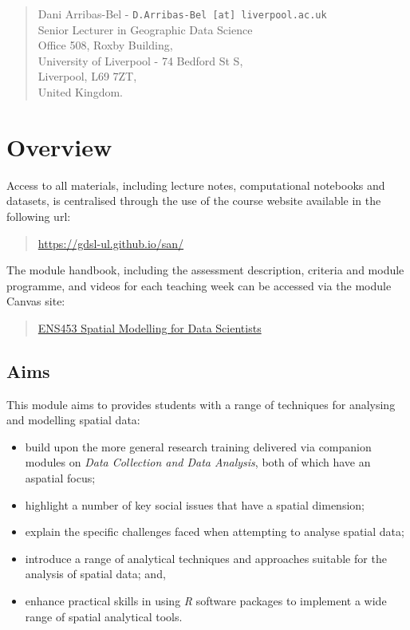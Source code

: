 \documentclass[
]{book}
\providecommand{\tightlist}{%
  \setlength{\itemsep}{0pt}\setlength{\parskip}{0pt}}
\begin{document}
\begin{quote}
Dani Arribas-Bel - \texttt{D.Arribas-Bel\ {[}at{]}\ liverpool.ac.uk}\\
Senior Lecturer in Geographic Data Science\\
Office 508, Roxby Building,\\
University of Liverpool - 74 Bedford St S,\\
Liverpool, L69 7ZT,\\
United Kingdom.
\end{quote}

\hypertarget{overview}{%
\chapter{Overview}\label{overview}}

Access to all materials, including lecture notes, computational notebooks and datasets, is centralised through the use of the course website available in the following url:

\begin{quote}
\url{https://gdsl-ul.github.io/san/}
\end{quote}

The module handbook, including the assessment description, criteria and module programme, and videos for each teaching week can be accessed via the module Canvas site:

\begin{quote}
\href{https://liverpool.instructure.com}{ENS453 Spatial Modelling for Data Scientists}
\end{quote}

\hypertarget{aims}{%
\section{Aims}\label{aims}}

This module aims to provides students with a range of techniques for analysing and modelling spatial data:

\begin{itemize}
\tightlist
\item
  build upon the more general research training delivered via companion modules on \emph{Data Collection and Data Analysis}, both of which have an aspatial focus;
\item
  highlight a number of key social issues that have a spatial dimension;
\item
  explain the specific challenges faced when attempting to analyse spatial data;
\item
  introduce a range of analytical techniques and approaches suitable for the analysis of spatial data; and,
\item
  enhance practical skills in using \emph{R} software packages to implement a wide range of spatial analytical tools.
\end{itemize}
\end{document}
